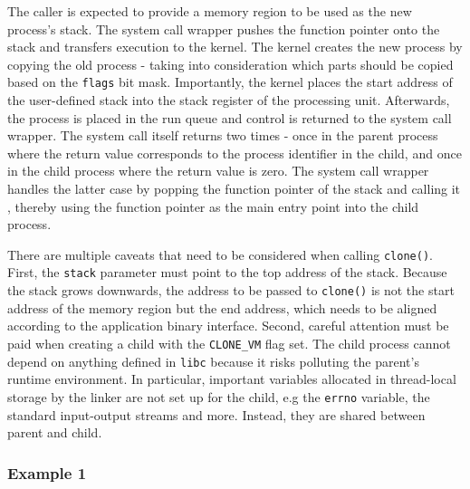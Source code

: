 The caller is expected to provide a memory region to be used as the new process's stack. 
The system call wrapper pushes the function pointer onto the stack and transfers execution 
to the kernel. The kernel creates the new process by copying the old process - taking into consideration 
which parts should be copied based on the \verb|flags| bit mask. Importantly, the kernel places 
the start address of the user-defined stack into the stack register of the processing unit.
Afterwards, the process is placed in the run queue and control is returned to the system call wrapper.
The system call itself returns two times - once in the parent process where the return value corresponds 
to the process identifier in the child, and once in the child process where the return value is zero. 
The system call wrapper handles the latter case by popping the function pointer of the stack 
and calling it \cite{aarch64/clone.S}, thereby using the function pointer as the main entry point 
into the child process.

There are multiple caveats that need to be considered when calling \verb|clone()|. 
First, the \verb|stack| parameter must point to the top address of the stack. Because the stack 
grows downwards, the address to be passed to \verb|clone()| is not the start address of the memory region but the 
end address, which needs to be aligned according to the application binary interface. Second, 
careful attention must be paid when creating a child with the \verb|CLONE_VM| flag set. 
The child process cannot depend on anything defined in \verb|libc| because it risks polluting 
the parent's runtime environment. In particular, important variables allocated in thread-local storage 
by the linker are not set up for the child, e.g the \verb|errno| variable, the standard input-output streams
and more. Instead, they are shared between parent and child. 

\subsubsection{Example 1}

